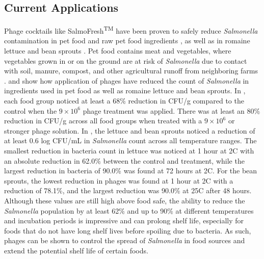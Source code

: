 \subsection{Current Applications}
Phage cocktails like SalmoFresh\textsuperscript{TM} have been proven to safely reduce \textit{Salmonella} contamination in pet food and raw pet food ingredients \cite{sofferBacteriophagesSafelyReduce2016}, as well as in romaine lettuce and bean sprouts \cite{zhangSalmoFreshEffectivenessControlling2019}.
Pet food contains meat and vegetables, where vegetables grown in or on the ground are at risk of \textit{Salmonella} due to contact with soil, manure, compost, and other agricultural runoff from neighboring farms \cite{kowalskaFreshVegetablesFruit2023}.
 and  show how application of phages have reduced the count of \textit{Salmonella} in ingredients used in pet food as well as romaine lettuce and bean sprouts. 
In , each food group noticed at least a 68\% reduction in CFU/g compared to the control when the $9\times 10^6$ phage treatment was applied. 
There was at least an 80\% reduction in CFU/g across all food groups when treated with a $9\times 10^6$ or stronger phage solution. 
In , the lettuce and bean sprouts noticed a reduction of at least 0.6 log CFU/mL in \textit{Salmonella} count across all temperature ranges. 
The smallest reduction in bacteria count in lettuce was noticed at 1 hour at 2\textdegree C with an absolute reduction in 62.0\% between the control and treatment, while the largest reduction in bacteria of 90.0\% was found at 72 hours at 2\textdegree C. 
For the bean sprouts, the lowest reduction in phages was found at 1 hour at 2\textdegree C with a reduction of 78.1\%, and the largest reduction was 90.0\% at 25\textdegree C after 48 hours. 
Although these values are still high above food safe, the ability to reduce the \textit{Salmonella} population by at least 62\% and up to 90\% at different temperatures and incubation periods is impressive and can prolong shelf life, especially for foods that do not have long shelf lives before spoiling due to bacteria. 
As such, phages can be shown to control the spread of \textit{Salmonella} in food sources and extend the potential shelf life of certain foods. 

